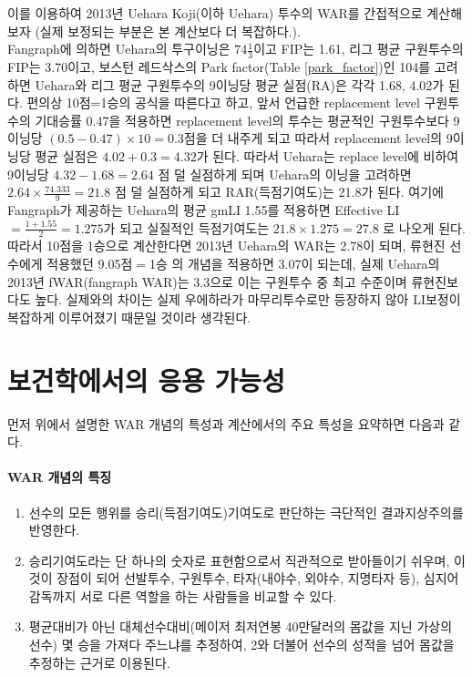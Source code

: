 \documentclass[11pt]{article}
\begin{document}
이를 이용하여 2013년 Uehara Koji(이하 Uehara) 투수의 WAR를 간접적으로 계산해 보자 (실제 보정되는 부분은 본 계산보다 더 복잡하다.).\\
Fangraph에 의하면 Uehara의 투구이닝은 $74\frac{1}{3}$이고 FIP는 1.61, 리그 평균 구원투수의 FIP는 3.70이고, 보스턴 레드삭스의 Park factor(Table \ref{park_factor})인 104를 고려하면 Uehara와 리그 평균 구원투수의 9이닝당 평균 실점(RA)은 각각 1.68, 4.02가 된다. 편의상 10점=1승의 공식을 따른다고 하고, 앞서 언급한 replacement level 구원투수의 기대승률 0.47을 적용하면 replacement level의 투수는 평균적인 구원투수보다 9이닝당 $(0.5-0.47) \times 10 = 0.3$점을 더 내주게 되고 따라서 replacement level의 9이닝당 평균 실점은 $4.02+0.3 = 4.32$가 된다. 따라서 Uehara는 replace level에 비하여 9이닝당 $4.32 - 1.68 = 2.64$ 점 덜 실점하게 되며 Uehara의 이닝을 고려하면 $2.64 \times \frac{74.333}{9} = 21.8$ 점 덜 실점하게 되고 RAR(득점기여도)는 21.8가 된다. 여기에 Fangraph가 제공하는 Uehara의 평균 gmLI 1.55를 적용하면 Effective LI$=\frac{1+1.55}{2} = 1.275$가 되고 실질적인 득점기여도는 $21.8 \times 1.275 = 27.8$ 로 나오게 된다. 따라서 10점을 1승으로 계산한다면 2013년 Uehara의 WAR는 2.78이 되며, 류현진 선수에게 적용했던 9.05점$=$1승 의 개념을 적용하면 3.07이 되는데, 실제 Uehara의 2013년 fWAR(fangraph WAR)는 3.3으로 이는 구원투수 중 최고 수준이며 류현진보다도 높다. 실제와의 차이는 실제 우에하라가 마무리투수로만 등장하지 않아 LI보정이 복잡하게 이루어졌기 때문일 것이라 생각된다. 




\section{보건학에서의 응용 가능성}\label{results}
먼저 위에서 설명한 WAR 개념의 특성과 계산에서의 주요 특성을 요약하면 다음과 같다.

\paragraph{WAR 개념의 특징} 
\begin{enumerate}
  \item 선수의 모든 행위를 승리(득점기여도)기여도로 판단하는 극단적인 결과지상주의를 반영한다.
  \item 승리기여도라는 단 하나의 숫자로 표현함으로서 직관적으로 받아들이기 쉬우며, 이것이 장점이 되어 선발투수, 구원투수, 타자(내야수, 외야수, 지명타자 등), 심지어 감독까지 서로 다른 역할을 하는 사람들을 비교할 수 있다.
  \item 평균대비가 아닌 대체선수대비(메이저 최저연봉 40만달러의 몸값을 지닌 가상의 선수) 몇 승을 가져다 주느냐를 추정하여, 2와 더불어 선수의 성적을 넘어 몸값을 추정하는 근거로 이용된다. 
\end{enumerate}
\end{document}
